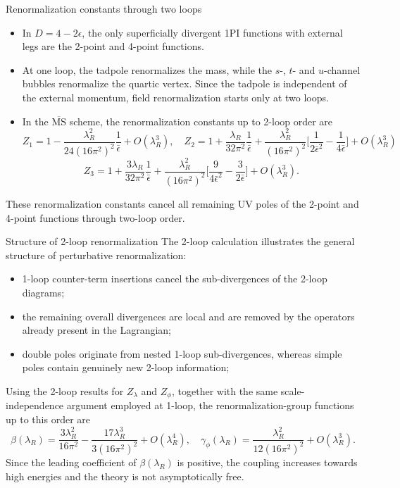 \documentclass[aspectratio=169,10pt]{beamer}
\newcommand{\MMS}{\overline{\mathrm{MS}}}
\begin{document}
\begin{frame}{Renormalization constants through two loops}
\begin{itemize}
    \item In $D = 4 - 2\epsilon$, the only superficially divergent 1PI functions with external legs are the 2-point and 4-point functions.
    \item At one loop, the tadpole renormalizes the mass, while the $s$-, $t$- and $u$-channel bubbles renormalize the quartic vertex. Since the tadpole is independent of the external momentum, field renormalization starts only at two loops.
    \item In the $\MMS$ scheme, the renormalization constants up to 2-loop order are
    \begin{equation}
        Z_1 = 1 - \frac{\lambda_R^2}{24(16\pi^2)^2}\frac{1}{\bar{\epsilon}} + O(\lambda_R^3),\quad Z_2 = 1 + \frac{\lambda_R}{32\pi^2}\frac{1}{\bar{\epsilon}} + \frac{\lambda_R^2}{(16\pi^2)^2}\bigg[\frac{1}{2\bar{\epsilon}^2} - \frac{1}{4\bar{\epsilon}}\bigg] + O(\lambda_R^3)
    \end{equation}
    \begin{equation}
        Z_3 = 1+\frac{3\lambda_R}{32\pi^2}\frac{1}{\bar{\epsilon}} + \frac{\lambda_R^2}{(16\pi^2)^2}\bigg[\frac{9}{4\bar{\epsilon}^2} - \frac{3}{2\bar{\epsilon}}\bigg] + O(\lambda_R^3).
    \end{equation}
\end{itemize}
These renormalization constants cancel all remaining UV poles of the 2-point and 4-point functions through two-loop order.
\end{frame}

\begin{frame}{Structure of 2-loop renormalization}
The 2-loop calculation illustrates the general structure of perturbative renormalization:
\begin{itemize}
    \item 1-loop counter-term insertions cancel the sub-divergences of the 2-loop diagrams;
    \item the remaining overall divergences are local and are removed by the operators already present in the Lagrangian;
    \item double poles originate from nested 1-loop sub-divergences, whereas simple poles contain genuinely new 2-loop information;
\end{itemize}
Using the 2-loop results for $Z_\lambda$ and $Z_\phi$, together with the same scale-independence argument employed at 1-loop, the renormalization-group functions up to this order are
\begin{equation}
\label{eq: 2-loop beta and gamma function}
    \beta(\lambda_R) = \frac{3\lambda_R^2}{16\pi^2} - \frac{17\lambda_R^3}{3(16\pi^2)^2} + O(\lambda_R^4), \quad \gamma_\phi(\lambda_R) = \frac{\lambda_R^2}{12(16\pi^2)^2} + O(\lambda_R^3).
\end{equation}
Since the leading coefficient of $\beta(\lambda_R)$ is positive, the coupling increases towards high energies and the theory is not asymptotically free.
\end{frame}
\end{document}
